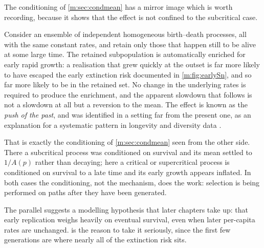 The conditioning of \cref{m:sec:condmean} has a mirror image which is worth
recording, because it shows that the effect is not confined to the subcritical
case.

Consider an ensemble of independent homogeneous birth--death processes, all with
the same constant rates, and retain only those that happen still to be alive at
some large time. The retained subpopulation is automatically enriched for early
rapid growth: a realisation that grew quickly at the outset is far more likely
to have escaped the early extinction risk documented in \cref{m:fig:earlySn},
and so far more likely to be in the retained set. No change in the underlying
rates is required to produce the enrichment, and the apparent slowdown that
follows is not a slowdown at all but a reversion to the mean. The effect is
known as the \emph{push of the past}, and was identified in a setting far from
the present one, as an explanation for a systematic pattern in longevity and
diversity data \cite{Budd2018}.

That is exactly the conditioning of \cref{m:sec:condmean} seen from the other
side. There a subcritical process was conditioned on survival and its mean
settled to $1/A(p)$ rather than decaying; here a critical or supercritical
process is conditioned on survival to a late time and its early growth appears
inflated. In both cases the conditioning, not the mechanism, does the work:
selection is being performed on paths after they have been generated.

The parallel suggests a modelling hypothesis that later chapters take up: that
early replication weighs heavily on eventual survival, even when later
per-capita rates are unchanged.  is the reason to take it
seriously, since the first few generations are where nearly all of the
extinction risk sits.

\FloatBarrier
